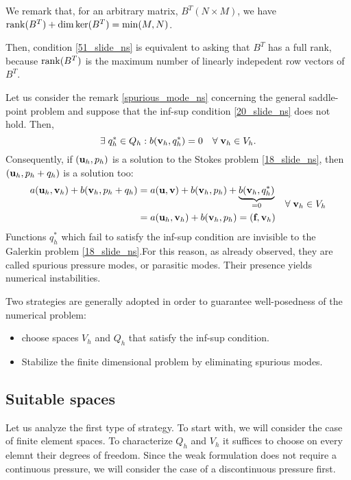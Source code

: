 \begin{remark}
    We remark that, for an arbitrary matrix, \(B^T (N\times M)\), we have \(\rank(B^T) + \dim \ker (B^T) = \min(M,N)\). 
    
    Then, condition \eqref{51_slide_ns} is equivalent to asking that \(B^T\) has a full rank, because \(\rank(B^T)\) is the maximum number of linearly indepedent row vectors of \(B^T\).
\end{remark}
Let us consider the remark \eqref{spurious_mode_ns}  concerning the general saddle-point problem and suppose that the inf-sup condition \eqref{20_slide_ns} does not hold. Then, 
\begin{equation}
    \exists \; q_h^* \in Q_h : b(\textbf{v}_h, q^*_h) = 0 \quad \forall \; \textbf{v}_h \in V_h.
    \label{52_slide_ns}
\end{equation}
Consequently, if \((\textbf{u}_h, p_h)\) is a solution to the Stokes problem \eqref{18_slide_ns}, then \((\textbf{u}_h, p_h+q_h)\) is a solution too:
\begin{equation*}
    \begin{aligned}
        a(\textbf{u}_h, \textbf{v}_h) + b(\textbf{v}_h, p_h+q_h) &= a(\textbf{u},\textbf{v}) + b(\textbf{v}_h, p_h) + \underbrace{b(\textbf{v}_h, q^*_h)}_{=0} \\ 
        &= a(\textbf{u}_h, \textbf{v}_h) + b(\textbf{v}_h, p_h) = (\textbf{f}, \textbf{v}_h)
    \end{aligned}
    \quad \forall \; \textbf{v}_h \in V_h
\end{equation*}
Functions \(q_h^*\) which fail to satisfy the inf-sup condition are invisible to the Galerkin problem \eqref{18_slide_ns}.For this reason, as already observed, they are called spurious pressure modes, or parasitic modes. Their presence yields numerical instabilities. 

Two strategies are generally adopted in order to guarantee well-posedness of the numerical problem:
\begin{itemize}
    \item choose spaces \(V_h\) and \(Q_h\) that satisfy the inf-sup condition. 
    \item Stabilize the finite dimensional problem by eliminating spurious modes.
\end{itemize}
\subsection{Suitable spaces}
Let us analyze the first type of strategy. To start with, we will consider the case of finite element spaces. To characterize \(Q_h\) and \(V_h\) it suffices to choose on every elemnt their degrees of freedom. Since the weak formulation does not require a continuous pressure, we will consider the case of a discontinuous pressure first. 


